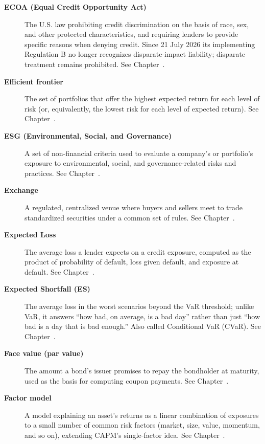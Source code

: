 \documentclass[../ai_in_finance]{subfiles}
\begin{document}
\begin{description}
\item[\textbf{ECOA (Equal Credit Opportunity Act)}] The U.S. law prohibiting credit discrimination on the basis of race, sex, and other protected characteristics, and requiring lenders to provide specific reasons when denying credit. Since 21 July 2026 its implementing Regulation B no longer recognizes disparate-impact liability; disparate treatment remains prohibited. See Chapter~.

\item[\textbf{Efficient frontier}] The set of portfolios that offer the highest expected return for each level of risk (or, equivalently, the lowest risk for each level of expected return). See Chapter~.

\item[\textbf{ESG (Environmental, Social, and Governance)}] A set of non-financial criteria used to evaluate a company's or portfolio's exposure to environmental, social, and governance-related risks and practices. See Chapter~.

\item[\textbf{Exchange}] A regulated, centralized venue where buyers and sellers meet to trade standardized securities under a common set of rules. See Chapter~.

\item[\textbf{Expected Loss}] The average loss a lender expects on a credit exposure, computed as the product of probability of default, loss given default, and exposure at default. See Chapter~.

\item[\textbf{Expected Shortfall (ES)}] The average loss in the worst scenarios beyond the VaR threshold; unlike VaR, it answers ``how bad, on average, is a bad day'' rather than just ``how bad is a day that is bad enough.'' Also called Conditional VaR (CVaR). See Chapter~.

\item[\textbf{Face value (par value)}] The amount a bond's issuer promises to repay the bondholder at maturity, used as the basis for computing coupon payments. See Chapter~.

\item[\textbf{Factor model}] A model explaining an asset's returns as a linear combination of exposures to a small number of common risk factors (market, size, value, momentum, and so on), extending CAPM's single-factor idea. See Chapter~.


\end{description}
\end{document}
